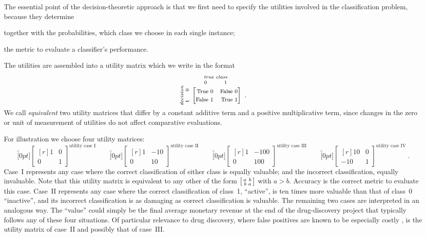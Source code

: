 \documentclass[\ifafour a4paper,12pt,\else a5paper,10pt,\fi%
onecolumn,oneside,article,%
british%
]{memoir}
\theoremstyle{remark}
\theoremstyle{innote}
\renewcommand*{\|}[1][]{\nonscript\:#1\vert\nonscript\:\mathopen{}}
\newcommand*{\umatrix}[4]{\begin{bmatrix*}[r]#1&#2\\#3&#4\end{bmatrix*}}
\newcommand*{\sumatrix}[4]{\begin{bsmallmatrix*}[r]#1&#2\\#3&#4\end{bsmallmatrix*}}
\begin{document}
The essential point of the decision-theoretic approach is that we first need to specify the utilities involved in the classification problem, because they determine
\begin{enumerate*}[label=(\roman*)]
\item together with the probabilities, which class we choose in each single instance;
\item the metric to evaluate a classifier's performance.
\end{enumerate*}
The utilities are assembled into a utility matrix which we write in the format
\begin{equation}
\label{eq:format_matrix}
  \rotatebox[origin=c]{90}{
    \clap{\textit{\parbox{4em}{\centering\scriptsize decision\\$1\hspace{1.5em}0$}}
    }}\ 
    \overbracket[0pt]{\umatrix{
    \text{\footnotesize True 0} }{ \text{\footnotesize False 0}}{
    \text{\footnotesize False 1} }{ \text{\footnotesize True 1}}
      }^{
      \clap{\textit{\parbox{6em}{\centering\scriptsize true class\\$0\hspace{3em}1$}}
    }} \ .
\end{equation}
We call \emph{equivalent} two utility matrices that differ by a constant additive term and a positive multiplicative term, since changes in the zero or unit of measurement of utilities do not affect comparative evaluations.

\smallskip


For illustration we choose four utility matrices:
\begin{equation}
  \label{eq:utility_matrices_demo}
  \overbracket[0pt]{\umatrix{1}{0}{0}{1}}^{\text{utility case I}} \qquad
  \overbracket[0pt]{\umatrix{1}{-10}{0}{10}}^{\text{utility case II}} \qquad
  \overbracket[0pt]{\umatrix{1}{-100}{0}{100}}^{\text{utility case III}} \qquad
  \overbracket[0pt]{\umatrix{10}{0}{-10}{1}}^{\text{utility case IV}} \ .
\end{equation}
Case~I represents any case where the correct classification of either class is equally valuable; and the incorrect classification, equally invaluable. Note that this utility matrix is equivalent to any other of the form $\sumatrix{a}{b}{b}{a}$ with $a>b$. Accuracy is the correct metric to evaluate this case. Case~II represents any case where the correct classification of class~1, \enquote{active}, is ten times more valuable than that of class~0 \enquote{inactive}, and its incorrect classification is as damaging as correct classification is valuable. The remaining two cases are interpreted in an analogous way. The \enquote{value} could simply be the final average monetary revenue at the end of the drug-discovery project that typically follows any of these four situations. Of particular relevance to drug discovery, where false positives are known to be especially costly \autocites{sinketal2010,hingoranietal2019}, is the utility matrix of case~II and possibly that of case~III.
\end{document}
